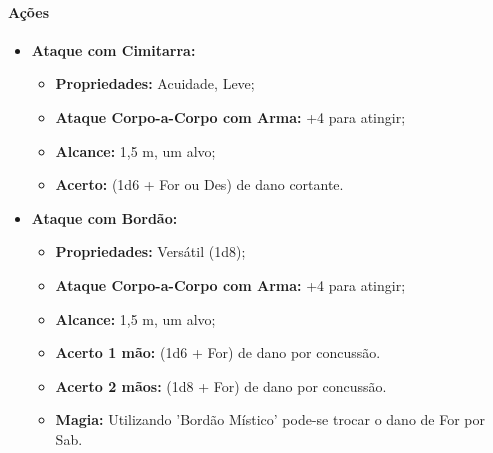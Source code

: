 \documentclass[a4paper,12p]{book}
\begin{document}
\begin{multicols}{2}
\begin{itemize}
		
		
		
		\end{itemize}
	
		\paragraph{Ações}

		
		\begin{itemize}
			\item \textbf{Ataque com Cimitarra:} 
			\begin{itemize}
				\item \textbf{Propriedades:} Acuidade, Leve;
				\item \textbf{Ataque Corpo-a-Corpo com Arma:} +4 para atingir;
				\item \textbf{Alcance:} 1,5 m, um alvo; 
				\item \textbf{Acerto:} (1d6 + For ou Des) de dano cortante.
			\end{itemize}
		
			\item \textbf{Ataque com Bordão:}
			\begin{itemize}
				\item \textbf{Propriedades:} Versátil (1d8);
				\item \textbf{Ataque Corpo-a-Corpo com Arma:} +4 para atingir;
				\item \textbf{Alcance:} 1,5 m, um alvo; 
				\item \textbf{Acerto 1 mão:} (1d6 + For) de dano por concussão.
				\item \textbf{Acerto 2 mãos:} (1d8 + For) de dano por concussão.
				\item \textbf{Magia:} Utilizando 'Bordão Místico' pode-se trocar o dano de For por Sab.
			\end{itemize}
		\end{itemize}
		
		
		

\end{multicols}
\end{document}
